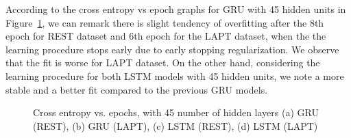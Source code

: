\documentclass[comsoc,conference]{IEEEtran}
\begin{document}
According to the cross entropy vs epoch graphs for GRU with 45 hidden units in Figure~\ref{R2}, we can remark there is slight tendency of overfitting after the 8th epoch for REST dataset and 6th epoch for the LAPT dataset, when the the learning procedure stops early due to early stopping regularization. We observe that the fit is worse for LAPT dataset. On the other hand, considering the learning procedure for both LSTM models with 45 hidden units, we note a more stable and a better fit compared to the previous GRU models.

\begin{figure}[!htb]
\centering
{}
\hfill
{}
\hfill
{}
\hfill
{}
\hfill
\caption{Cross entropy vs. epochs, with 45 number of hidden layers (a) GRU (REST), (b) GRU (LAPT), (c) LSTM (REST), (d) LSTM (LAPT)}
\label{R2} 
\end{figure}
\end{document}
